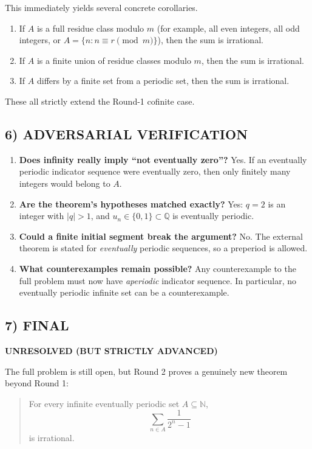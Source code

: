 \medskip
This immediately yields several concrete corollaries.

\begin{enumerate}
\item If $A$ is a full residue class modulo $m$ (for example, all even integers, all odd integers, or $A=\{n:n\equiv r\pmod m\}$), then the sum is irrational.
\item If $A$ is a finite union of residue classes modulo $m$, then the sum is irrational.
\item If $A$ differs by a finite set from a periodic set, then the sum is irrational.
\end{enumerate}

These all strictly extend the Round-1 cofinite case.

\subsection*{6) ADVERSARIAL VERIFICATION}
\begin{enumerate}
\item \textbf{Does infinity really imply ``not eventually zero''?} Yes. If an eventually periodic indicator sequence were eventually zero, then only finitely many integers would belong to $A$.
\item \textbf{Are the theorem's hypotheses matched exactly?} Yes: $q=2$ is an integer with $|q|>1$, and $u_n\in\{0,1\}\subset\mathbb{Q}$ is eventually periodic.
\item \textbf{Could a finite initial segment break the argument?} No. The external theorem is stated for \emph{eventually} periodic sequences, so a preperiod is allowed.
\item \textbf{What counterexamples remain possible?} Any counterexample to the full problem must now have \emph{aperiodic} indicator sequence. In particular, no eventually periodic infinite set can be a counterexample.
\end{enumerate}

\subsection*{7) FINAL}
\textbf{UNRESOLVED (BUT STRICTLY ADVANCED)}

The full problem is still open, but Round 2 proves a genuinely new theorem beyond Round 1:

\begin{quote}
For every infinite eventually periodic set $A\subseteq\mathbb{N}$,
\[
\sum_{n\in A}\frac{1}{2^n-1}
\]
is irrational.
\end{quote}

